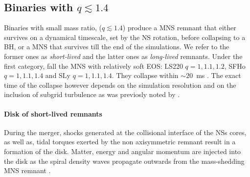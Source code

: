 \subsection{Binaries with $q\lesssim1.4$}


Binaries with small mass ratio, ($q\lesssim1.4$) produce a \ac{MNS} remnant
that either survives on a dynamical timescale, set by the \ac{NS} rotation, before
collapsing to a \ac{BH}, or a \ac{MNS} that survives till the end of the simulations.
We refer to the former ones as \textit{short-lived} and the latter ones as 
\textit{long-lived} remnants.
Under the first category, fall the \ac{MNS} with relatively soft \ac{EOS}:
LS220 $q=1,1.1,1.2$, SFHo $q=1,1.1,1.4$ and SLy $q=1,1.1,1.4$. 
They collapse within $\sim20$~ms \pmerg. 
The exact time of the collapse however depends on the simulation resolution 
and on the inclusion of subgrid turbulence as was previosly noted by \citet{Radice:2017zta}.

\paragraph{Disk of short-lived remnants}

During the merger, shocks generated at the collisional interface of the \acp{NS} cores,
as well as, tidal torques exerted by the non axisymmetric remnant result in a formation
of the disk. 
Matter, energy and angular momentum are injected into the disk as the spiral density waves 
propagate outwards from the mass-shedding \ac{MNS} remnant 
\citep{Bernuzzi:2015opx,Radice:2018xqa}.

